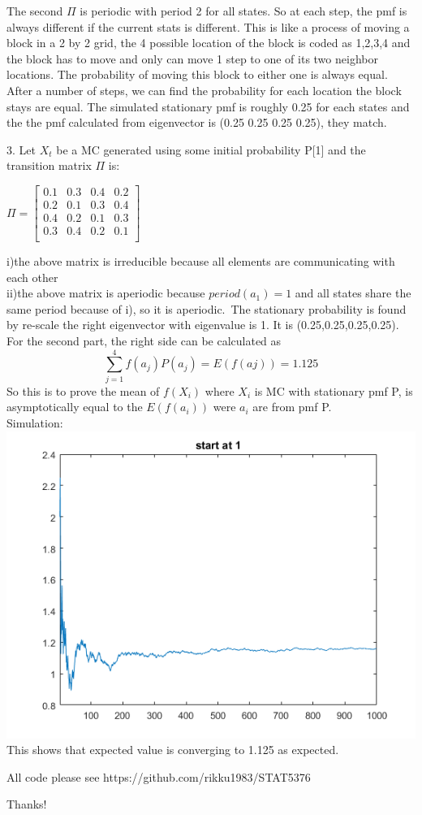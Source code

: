 \documentclass[11pt]{article}
\begin{document}
The second $\Pi$ is periodic with period 2 for all states. So at each step, the pmf is always different if the current stats is different. This is like a process of moving a block in a 2 by 2 grid, the 4 possible location of the block is coded as 1,2,3,4 and the block has to move and only can move 1 step to one of its two neighbor locations. The probability of moving this block to either one is always equal. After a number of steps, we can find the probability for each location the block stays are equal. The simulated stationary pmf is roughly 0.25 for each states and the the pmf calculated from eigenvector is (0.25 0.25 0.25 0.25), they match.\\

\bigskip

3. Let $X_t$ be a MC generated using some initial probability P[1] and the transition matrix $\Pi$ is:\\
\begin{center}
$
\Pi=
\begin{bmatrix}
0.1&0.3&0.4&0.2\\
0.2&0.1&0.3&0.4\\
0.4&0.2&0.1&0.3\\
0.3&0.4&0.2&0.1\\
\end{bmatrix}
$
\end{center}
i)the above matrix is irreducible because all elements are communicating with each other\\
ii)the above matrix is aperiodic because $period(a_1)=1$ and all states share the same period because of i), so it is aperiodic.\
The stationary probability is found by re-scale the right eigenvector with eigenvalue is 1. It is (0.25,0.25,0.25,0.25).\\
For the second part, the right side can be calculated as
$$\sum_{j=1}^4f(a_j)P(a_j)=E(f(aj))=1.125$$
So this is to prove the mean of $f(X_i)$ where $X_i$ is MC with stationary pmf P, is asymptotically equal to the $E(f(a_i))$ were $a_i$ are from pmf P.\\
Simulation:\\
\includegraphics[scale=1]{hw2p4.png}\\
This shows that expected value is converging to 1.125 as expected.\\

\bigskip

All code please see https://github.com/rikku1983/STAT5376\\
\bigskip

Thanks!
\end{document}
